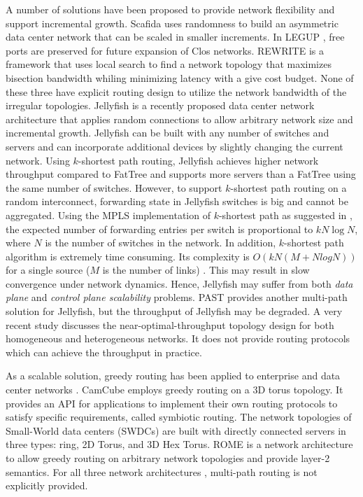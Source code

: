 \documentclass[10pt,conference]{IEEEtran}
\begin{document}
A number of solutions have been proposed to provide network flexibility and support incremental growth.
Scafida \cite{Scafida} uses randomness to build an asymmetric data center network that can be scaled in
smaller increments.
In LEGUP \cite{LEGUP}, free ports are preserved for future expansion of Clos networks.
REWRITE \cite{REWRITE} is a framework that uses local search to find a network topology that maximizes bisection bandwidth whiling minimizing latency with a give cost budget.
None of these three \cite{Scafida} \cite{LEGUP} \cite{REWRITE} have explicit routing design to utilize the network bandwidth of the irregular topologies.
Jellyfish \cite{Jellyfish} is a recently proposed data center network architecture that applies random connections to allow arbitrary network size and incremental growth.
Jellyfish can be built with any number of switches and servers and can incorporate additional devices by slightly changing the current network.
Using $k$-shortest path routing, Jellyfish achieves higher network throughput compared to FatTree \cite{fattree} and supports more servers than a FatTree using the same number of switches.
However, to support $k$-shortest path routing on a random interconnect, forwarding state in Jellyfish switches is big and cannot be aggregated.
Using the MPLS implementation of $k$-shortest path as suggested in \cite{Jellyfish}, the expected number of forwarding entries per switch is proportional to $kN\log N$, where $N$ is the number of switches in the network.
In addition, $k$-shortest path algorithm is extremely time consuming. Its complexity is $O(kN(M+NlogN))$ for a single source ($M$ is the number of links) \cite{routingmesh}. This may result in slow convergence under network dynamics.
Hence, Jellyfish may suffer from both \emph{data plane} and \emph{control plane scalability} problems.
PAST \cite{PAST} provides another multi-path solution for Jellyfish, but the throughput of Jellyfish may be degraded.
A very recent study \cite{Godfrey14} discusses the near-optimal-throughput topology design for both homogeneous and heterogeneous networks.
It does not provide routing protocols which can achieve the throughput in practice.



As a scalable solution, greedy routing has been applied to enterprise and data center networks  \cite{Symbiotic} \cite{SWDC} \cite{ROME}.
CamCube \cite{Symbiotic} employs greedy routing on a 3D torus topology.
It provides an API for applications to implement their own routing protocols to satisfy specific requirements, called symbiotic routing.
The network topologies of Small-World data centers (SWDCs) are built with directly connected servers in three types: ring, 2D Torus, and 3D Hex Torus.
ROME \cite{ROME} is a network architecture to allow greedy routing on arbitrary network topologies and provide layer-2 semantics. For all three network architectures \cite{Symbiotic} \cite{SWDC} \cite{ROME}, multi-path routing is not explicitly provided.
\end{document}

